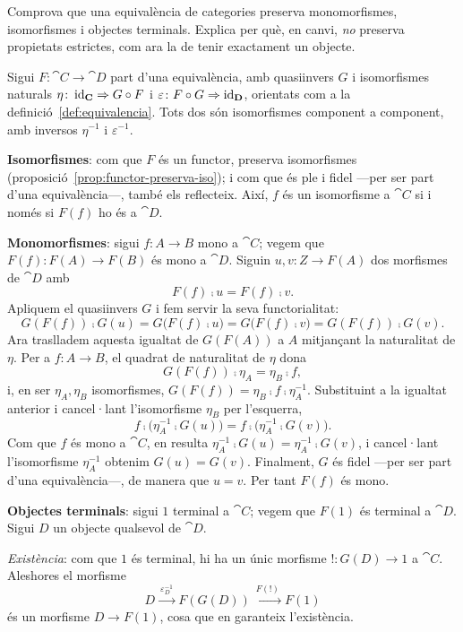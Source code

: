 \begin{exercici}\label{pr-equivalencia-preserva}
Comprova que una equivalència de categories preserva monomorfismes, isomorfismes i objectes terminals. Explica per què, en canvi, \emph{no} preserva propietats estrictes, com ara la de tenir exactament un objecte.
\end{exercici}

\begin{solucio}
Sigui $F\colon\cat{C}\to\cat{D}$ part d'una equivalència, amb quasiinvers $G$ i isomorfismes naturals $\eta\colon\operatorname{id}_{\mathbf{C}}\Rightarrow G\circ F$ i $\varepsilon\colon F\circ G\Rightarrow\operatorname{id}_{\mathbf{D}}$, orientats com a la definició~\ref{def:equivalencia}. Tots dos són isomorfismes component a component, amb inversos $\eta^{-1}$ i $\varepsilon^{-1}$.

\textbf{Isomorfismes}: com que $F$ és un functor, preserva isomorfismes (proposició~\ref{prop:functor-preserva-iso}); i com que és ple i fidel ---per ser part d'una equivalència---, també els reflecteix. Així, $f$ és un isomorfisme a $\cat{C}$ si i només si $F(f)$ ho és a $\cat{D}$.

\textbf{Monomorfismes}: sigui $f\colon A\to B$ mono a $\cat{C}$; vegem que $F(f)\colon F(A)\to F(B)$ és mono a $\cat{D}$. Siguin $u,v\colon Z\to F(A)$ dos morfismes de $\cat{D}$ amb
\[
F(f)\comp u=F(f)\comp v.
\]
Apliquem el quasiinvers $G$ i fem servir la seva functorialitat:
\[
G(F(f))\comp G(u)=G\bigl(F(f)\comp u\bigr)=G\bigl(F(f)\comp v\bigr)=G(F(f))\comp G(v).
\]
Ara traslladem aquesta igualtat de $G(F(A))$ a $A$ mitjançant la naturalitat de $\eta$. Per a $f\colon A\to B$, el quadrat de naturalitat de $\eta$ dona
\[
G(F(f))\comp\eta_A=\eta_B\comp f,
\]
i, en ser $\eta_A,\eta_B$ isomorfismes, $G(F(f))=\eta_B\comp f\comp\eta_A^{-1}$. Substituint a la igualtat anterior i cancel·lant l'isomorfisme $\eta_B$ per l'esquerra,
\[
f\comp\bigl(\eta_A^{-1}\comp G(u)\bigr)=f\comp\bigl(\eta_A^{-1}\comp G(v)\bigr).
\]
Com que $f$ és mono a $\cat{C}$, en resulta $\eta_A^{-1}\comp G(u)=\eta_A^{-1}\comp G(v)$, i cancel·lant l'isomorfisme $\eta_A^{-1}$ obtenim $G(u)=G(v)$. Finalment, $G$ és fidel ---per ser part d'una equivalència---, de manera que $u=v$. Per tant $F(f)$ és mono.

\textbf{Objectes terminals}: sigui $1$ terminal a $\cat{C}$; vegem que $F(1)$ és terminal a $\cat{D}$. Sigui $D$ un objecte qualsevol de $\cat{D}$.

\emph{Existència}: com que $1$ és terminal, hi ha un únic morfisme $!\colon G(D)\to 1$ a $\cat{C}$. Aleshores el morfisme
\[
D\xrightarrow{\ \varepsilon_D^{-1}\ }F(G(D))\xrightarrow{\ F(!)\ }F(1)
\]
és un morfisme $D\to F(1)$, cosa que en garanteix l'existència.


\end{solucio}
